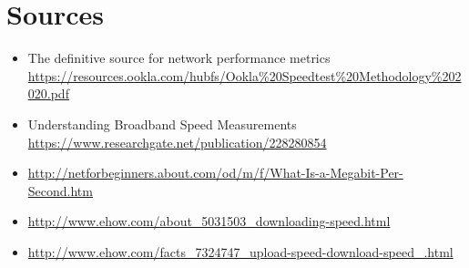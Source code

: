 \documentclass{article}
\begin{document}
\pagebreak
\section{Sources}
\begin{itemize}
    \item The definitive source for
network performance metrics \url{https://resources.ookla.com/hubfs/Ookla%20Speedtest%20Methodology%202020.pdf}
    \item Understanding Broadband Speed Measurements \url{https://www.researchgate.net/publication/228280854}
     \item  \url{http://netforbeginners.about.com/od/m/f/What-Is-a-Megabit-Per-Second.htm}
    \item \url{http://www.ehow.com/about_5031503_downloading-speed.html}
    \item \url{http://www.ehow.com/facts_7324747_upload-speed-download-speed_.html}

\end{itemize}
\end{document}
